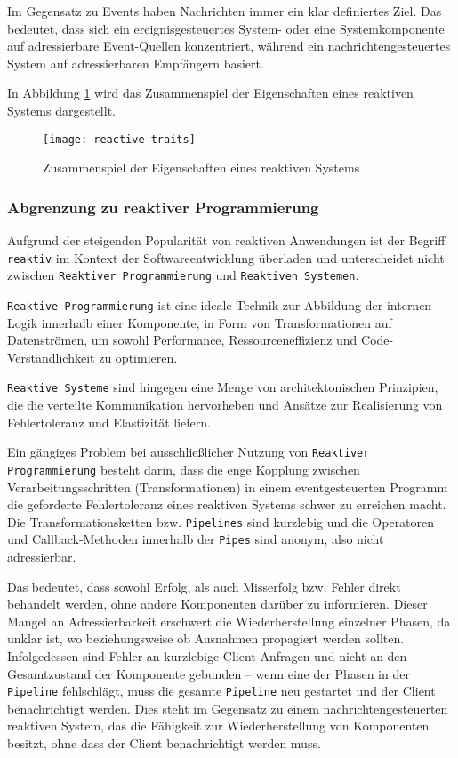 Im Gegensatz zu Events haben Nachrichten immer ein klar definiertes Ziel.
Das bedeutet, dass sich ein ereignisgesteuertes System- oder eine Systemkomponente auf adressierbare Event-Quellen konzentriert,
während ein nachrichtengesteuertes System auf adressierbaren Empfängern basiert.

In Abbildung \ref{fig:reactive-traits} wird das Zusammenspiel der Eigenschaften eines reaktiven Systems dargestellt.

\begin{figure}[ht!]
	\centering
	\texttt{[image: reactive-traits]}
	\caption{Zusammenspiel der Eigenschaften eines reaktiven Systems \parencite{ReactiveSystems}}
	\label{fig:reactive-traits}
\end{figure}

\subsubsection{Abgrenzung zu reaktiver Programmierung}
\label{subsubsection:abgrenzung_reaktive_programmierung}
Aufgrund der steigenden Popularität von reaktiven Anwendungen ist der Begriff \verb|reaktiv| im Kontext der Softwareentwicklung
überladen und unterscheidet nicht zwischen \linebreak\verb|Reaktiver Programmierung| und \verb|Reaktiven Systemen|.

\verb|Reaktive Programmierung| ist eine ideale Technik zur Abbildung der internen Logik innerhalb einer Komponente, in Form von Transformationen
auf Datenströmen, um sowohl Performance, Ressourceneffizienz und Code-Verständlichkeit zu optimieren.

\verb|Reaktive Systeme| sind hingegen eine Menge von architektonischen Prinzipien, die die verteilte Kommunikation hervorheben und
Ansätze zur Realisierung von Fehlertoleranz und Elastizität liefern.

Ein gängiges Problem bei ausschließlicher Nutzung von \verb|Reaktiver Programmierung| besteht darin, dass die enge Kopplung
zwischen Verarbeitungsschritten (Transformationen) in einem eventgesteuerten Programm die geforderte Fehlertoleranz eines reaktiven Systems
schwer zu erreichen macht.
Die Transformationsketten bzw. \verb|Pipelines| sind kurzlebig und die Operatoren und Callback-Methoden innerhalb der \verb|Pipes|
sind anonym, also nicht adressierbar.

Das bedeutet, dass sowohl Erfolg, als auch Misserfolg bzw. Fehler direkt behandelt werden, ohne andere Komponenten darüber zu informieren.
Dieser Mangel an Adressierbarkeit erschwert die Wiederherstellung einzelner Phasen, da unklar ist, wo beziehungsweise ob Ausnahmen
propagiert werden sollten. Infolgedessen sind Fehler an kurzlebige Client-Anfragen und nicht an den
Gesamtzustand der Komponente gebunden – wenn eine der Phasen in der \verb|Pipeline| fehlschlägt, muss die gesamte \verb|Pipeline| neu
gestartet und der Client benachrichtigt werden. Dies steht im Gegensatz zu einem nachrichtengesteuerten reaktiven System, das
die Fähigkeit zur Wiederherstellung von Komponenten besitzt, ohne dass der Client benachrichtigt werden muss.

